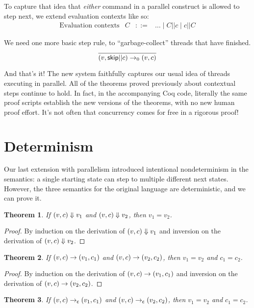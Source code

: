 \documentclass{amsbook}
\newtheorem{theorem}{Theorem}[chapter]
\theoremstyle{definition}
\theoremstyle{remark}
\numberwithin{section}{chapter}
\numberwithin{equation}{chapter}
\begin{document}
To capture that idea that \emph{either} command in a parallel construct is allowed to step next, we extend evaluation contexts like so:
\encoding
$$\begin{array}{rrcl}
  \textrm{Evaluation contexts} & C &::=& \ldots \mid C || c \mid c || C
\end{array}$$

We need one more basic step rule, to ``garbage-collect'' threads that have finished.
$$\infer{\smallstepo{(v, \skipe || c)}{(v, c)}}{}$$

And that's it!
The new system faithfully captures our usual idea of threads executing in parallel.
All of the theorems proved previously about contextual steps continue to hold.
In fact, in the accompanying Coq code, literally the same proof scripts establish the new versions of the theorems, with no new human proof effort.
It's not often that concurrency comes for free in a rigorous proof!


\section{Determinism}

Our last extension with parallelism introduced intentional nondeterminism in the semantics: a single starting state can step to multiple different next states.
However, the three semantics for the original language are deterministic, and we can prove it.

\begin{theorem}
  If $(v, c) \Downarrow v_1$ and $(v, c) \Downarrow v_2$, then $v_1 = v_2$.
\end{theorem}

\begin{proof}
  By induction on the derivation of $(v, c) \Downarrow v_1$ and inversion on the derivation of $(v, c) \Downarrow v_2$.
\end{proof}

\begin{theorem}
  If $(v, c) \to (v_1, c_1)$ and $(v, c) \to (v_2, c_2)$, then $v_1 = v_2$ and $c_1 = c_2$.
\end{theorem}

\begin{proof}
  By induction on the derivation of $(v, c) \to (v_1, c_1)$ and inversion on the derivation of $(v, c) \to (v_2, c_2)$.
\end{proof}

\begin{theorem}
  If $(v, c) \to_\mathsf{c} (v_1, c_1)$ and $(v, c) \to_\mathsf{c} (v_2, c_2)$, then $v_1 = v_2$ and $c_1 = c_2$.
\end{theorem}
\end{document}
